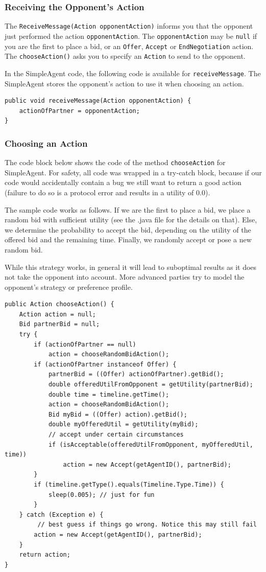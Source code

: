 \documentclass[]{llncs}
\begin{document}
\FloatBarrier

\subsubsection{Receiving the Opponent's Action}\label{sec:receiveAction}
The \texttt{ReceiveMessage(Action opponentAction)} informs you that the opponent just performed the action \texttt{opponentAction}. The \texttt{opponentAction} may be  \texttt{null} if you are the first to place a bid, or an \texttt{Offer}, \texttt{Accept} or \texttt{EndNegotiation} action.
The \texttt{chooseAction()} asks you to specify an \texttt{Action} to send to the opponent.

In the SimpleAgent code, the following code is available for \texttt{receiveMessage}. The SimpleAgent stores the opponent's action to use it when choosing an action.

\begin{lstlisting}
public void receiveMessage(Action opponentAction) {
	actionOfPartner = opponentAction;
}
\end{lstlisting}

\subsubsection{Choosing an Action}\label{sec:chooseAction}
The code block below shows the code of the method \texttt{chooseAction} for SimpleAgent. For safety, all code was wrapped in a try-catch block, because if our code would accidentally contain a bug we still want to return a good action (failure to do so is a protocol error and results in a utility of 0.0).

The sample code works as follows. If we are the first to place a bid, we place a random bid with sufficient utility (see the .java file for the details on that). Else, we determine the probability to accept the bid, depending on the utility of the offered bid and the remaining time. Finally, we randomly accept or pose a new random bid.

While this strategy works, in general it will lead to suboptimal results as it does not take the opponent into account. More advanced parties try to model the opponent's strategy or preference profile.

\begin{lstlisting}
public Action chooseAction() {
	Action action = null;
	Bid partnerBid = null;
	try {
		if (actionOfPartner == null)
			action = chooseRandomBidAction();
		if (actionOfPartner instanceof Offer) {
			partnerBid = ((Offer) actionOfPartner).getBid();
			double offeredUtilFromOpponent = getUtility(partnerBid);
			double time = timeline.getTime();
			action = chooseRandomBidAction();
			Bid myBid = ((Offer) action).getBid();
			double myOfferedUtil = getUtility(myBid);
			// accept under certain circumstances
			if (isAcceptable(offeredUtilFromOpponent, myOfferedUtil, time))
				action = new Accept(getAgentID(), partnerBid);
		}
		if (timeline.getType().equals(Timeline.Type.Time)) {
			sleep(0.005); // just for fun
		}
	} catch (Exception e) {
		 // best guess if things go wrong. Notice this may still fail
		action = new Accept(getAgentID(), partnerBid);
	}
	return action;
}
\end{lstlisting}
\end{document}

